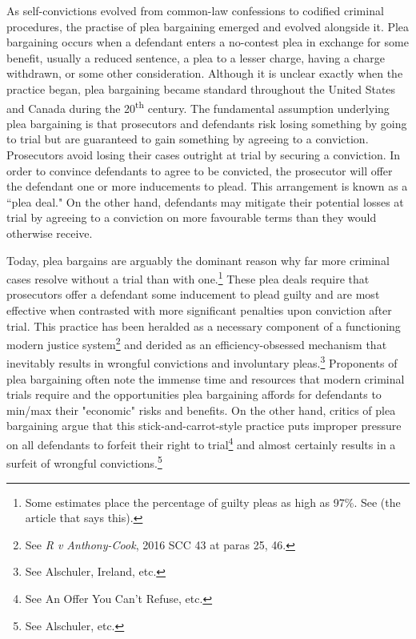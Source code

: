 As self-convictions evolved from common-law confessions to codified criminal procedures, the practise of plea bargaining emerged and evolved alongside it. Plea bargaining occurs when a defendant enters a no-contest plea in exchange for some benefit, usually a reduced sentence, a plea to a lesser charge, having a charge withdrawn, or some other consideration. Although it is unclear exactly when the practice began, plea bargaining became standard throughout the United States and Canada during the 20\textsuperscript{th} century. The fundamental assumption underlying plea bargaining is that prosecutors and defendants risk losing something by going to trial but are guaranteed to gain something by agreeing to a conviction. Prosecutors avoid losing their cases outright at trial by securing a conviction. In order to convince defendants to agree to be convicted, the prosecutor will offer the defendant one or more inducements to plead. This arrangement is known as a ``plea deal."  On the other hand, defendants may mitigate their potential losses at trial by agreeing to a conviction on more favourable terms than they would otherwise receive. 

Today, plea bargains are arguably the dominant reason why far more criminal cases resolve without a trial than with one.\footnote{Some estimates place the percentage of guilty pleas as high as 97\%. See (the article that says this).} These plea deals require that prosecutors offer a defendant some inducement to plead guilty and are most effective when contrasted with more significant penalties upon conviction after trial. This practice has been heralded as a necessary component of a functioning modern justice system\footnote{See \textit{R v Anthony-Cook}, 2016 SCC 43 at paras 25, 46.} and derided as an efficiency-obsessed mechanism that inevitably results in wrongful convictions and involuntary pleas.\footnote{See Alschuler, Ireland, etc.} Proponents of plea bargaining often note the immense time and resources that modern criminal trials require and the opportunities plea bargaining affords for defendants to min/max their "economic" risks and benefits. On the other hand, critics of plea bargaining argue that this stick-and-carrot-style practice puts improper pressure on all defendants to forfeit their right to trial\footnote{See An Offer You Can't Refuse, etc.} and almost certainly results in a surfeit of wrongful convictions.\footnote{See Alschuler, etc.}

